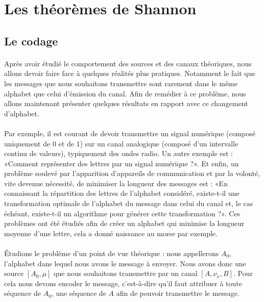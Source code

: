 \section{Les théorèmes de Shannon}

\subsection{Le codage}
	\paragraph{}
	Après avoir étudié le comportement des sources et des canaux théoriques, nous
	allons devoir faire face à quelques réalités plus pratiques. Notamment le fait
	que les messages que nous souhaitons transmettre sont rarement dans le 
	même alphabet que celui d'émission du canal. Afin de remédier à ce problème,
	nous allons maintenant présenter quelques résultats en rapport avec ce 
	changement d'alphabet. 
	
	\paragraph{}
	Par exemple, il est courant de devoir transmettre un signal numérique
	(composé uniquement de 0 et de 1) sur un canal analogique (composé 
	d'un intervalle continu de valeurs), typiquement des ondes radio.
	Un autre exemple est : «Comment représenter des 
	lettres par un signal numérique ?». Et enfin, un problème soulevé par 
	l'apparition d'appareils de communication et par la volonté, vite devenue nécessité, 
	de minimiser la longueur des messages est :
	«En connaissant la répartition des lettres de l'alphabet considéré,
	existe-t-il une transformation optimale de l'alphabet du message
	dans celui du canal et, le cas échéant, existe-t-il un algorithme pour générer cette transformation ?».
	Ces problèmes ont été étudiés afin de créer un alphabet qui minimise la longueur moyenne
	d'une lettre, cela a donné naissance au morse par exemple. 
	
	\paragraph{}
	Étudions le problème d'un point de vue théorique :
	nous appellerons $A_0$, l'alphabet dans lequel nous avons le message à envoyer. Nous avons donc une source 
	$[A_0,\mu]$ que nous souhaitons transmettre par un canal $[A,\nu_x,B]$. Pour cela nous devons encoder
	le message, c'est-à-dire qu'il faut attribuer à toute séquence de $A_0$, une séquence de $A$ afin de 
	pouvoir transmettre le message.

